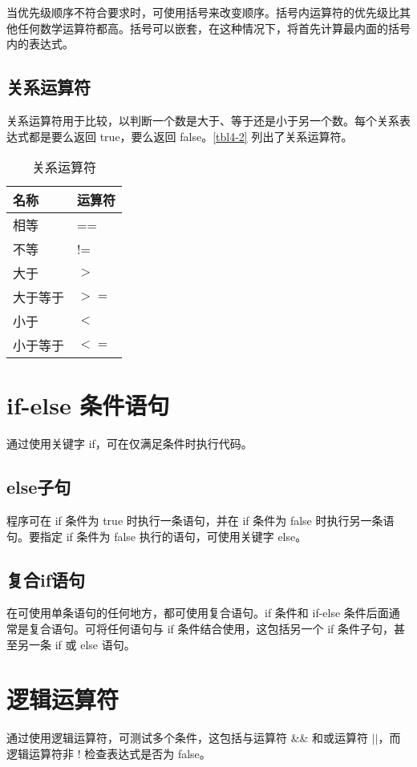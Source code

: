 当优先级顺序不符合要求时，可使用括号来改变顺序。括号内运算符的优先级比其他任何数学运算符都高。括号可以嵌套，在这种情况下，将首先计算最内面的括号内的表达式。

\subsection*{关系运算符}
关系运算符用于比较，以判断一个数是大于、等于还是小于另一个数。每个关系表达式都是要么返回 true，要么返回 false。\autoref{tbl4-2} 列出了关系运算符。

\begin{table}
    \centering
    \caption{关系运算符}
    \label{tbl4-2}
    \begin{tabular}{ll}
        \hline
        名称   & 运算符  \\
        \hline
        相等   & ==   \\
        不等   & !=   \\
        大于   & $>$  \\
        大于等于 & $>=$ \\
        小于   & $<$  \\
        小于等于 & $<=$ \\
        \hline
    \end{tabular}
\end{table}
\section{if-else 条件语句}
通过使用关键字 if，可在仅满足条件时执行代码。
\subsection*{else子句}
程序可在 if 条件为 true 时执行一条语句，并在 if 条件为 false 时执行另一条语句。要指定 if 条件为 false 执行的语句，可使用关键字 else。
\subsection*{复合if语句}
在可使用单条语句的任何地方，都可使用复合语句。if 条件和 if-else 条件后面通常是复合语句。可将任何语句与 if 条件结合使用，这包括另一个 if 条件子句，甚至另一条 if 或 else 语句。

\section{逻辑运算符}
通过使用逻辑运算符，可测试多个条件，这包括与运算符 \&\& 和或运算符 $||$，而逻辑运算符非 ! 检查表达式是否为 false。
